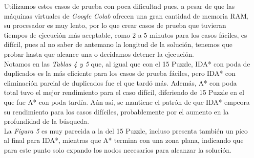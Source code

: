 \documentclass[a4paper,10pt]{article}
\begin{document}
    Utilizamos estos casos de prueba con poca dificultad pues, a pesar de que las
    m\'aquinas virtuales de \textit{Google Colab} ofrecen una gran cantidad de memoria
    RAM, su procesador es muy lento, por lo que crear casos de prueba que tuvieran
    tiempos de ejecuci\'on m\'as aceptable, como 2 a 5 minutos para los casos f\'aciles,
    es dif\'icil, pues al no saber de antemano la longitud de la soluci\'on, tenemos
    que probar hasta que alcance una o decidamos detener la ejecuci\'on. \\ 
    
    Notamos en las \textit{Tablas 4 y 5} que, al igual que con el 15 Puzzle, IDA* con
    poda de duplicados es la m\'as eficiente para los casos de prueba f\'aciles, pero 
    IDA* con eliminaci\'on parcial de duplicados fue el que tard\'o m\'as. Adem\'as,
    A* con poda total tuvo el mejor rendimiento para el caso dif\'icil, diferiendo de
    15 Puzzle en el que fue A* con poda tard\'ia. A\'un as\'i, se mantiene el patr\'on 
    de que IDA* empeora su rendimiento para los casos dif\'iciles, probablemente por 
    el aumento en la profundidad de la b\'usqueda. \\
    
    La \textit{Figura 5} es muy parecida a la del 15 Puzzle, incluso presenta tambi\'en
    un pico al final para IDA*, mientras que A* termina con una zona plana, indicando
    que para este punto solo expando los nodos necesarios para alcanzar la soluci\'on.
    
\end{document}
